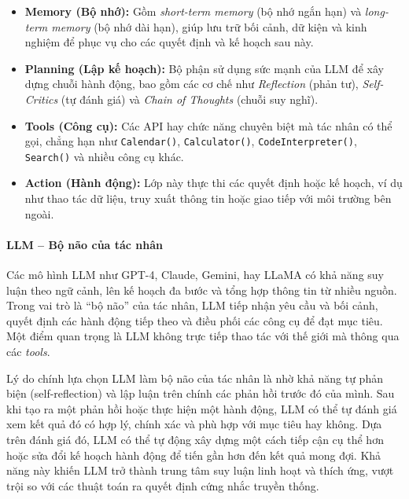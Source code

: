 \documentclass{article}
\begin{document}
\begin{itemize}[topsep=0pt, itemsep=0pt, leftmargin=40pt]
	\item \textbf{Memory (Bộ nhớ):} Gồm \textit{short-term memory} (bộ nhớ ngắn hạn) và \textit{long-term memory} (bộ nhớ dài hạn), giúp lưu trữ bối cảnh, dữ kiện và kinh nghiệm để phục vụ cho các quyết định và kế hoạch sau này.
	\item \textbf{Planning (Lập kế hoạch):} Bộ phận sử dụng sức mạnh của LLM để xây dựng chuỗi hành động, bao gồm các cơ chế như \textit{Reflection} (phản tư), \textit{Self-Critics} (tự đánh giá) và \textit{Chain of Thoughts} (chuỗi suy nghĩ).
	\item \textbf{Tools (Công cụ):} Các API hay chức năng chuyên biệt mà tác nhân có thể gọi, chẳng hạn như \texttt{Calendar()}, \texttt{Calculator()}, \texttt{CodeInterpreter()}, \texttt{Search()} và nhiều công cụ khác.
	\item \textbf{Action (Hành động):} Lớp này thực thi các quyết định hoặc kế hoạch, ví dụ như thao tác dữ liệu, truy xuất thông tin hoặc giao tiếp với môi trường bên ngoài.
\end{itemize}

\paragraph{LLM – Bộ não của tác nhân}
Các mô hình LLM như GPT-4, Claude, Gemini, hay LLaMA có khả năng suy luận theo ngữ cảnh, lên kế hoạch đa bước và tổng hợp thông tin từ nhiều nguồn. Trong vai trò là “bộ não” của tác nhân, LLM tiếp nhận yêu cầu và bối cảnh, quyết định các hành động tiếp theo và điều phối các công cụ để đạt mục tiêu. Một điểm quan trọng là LLM không trực tiếp thao tác với thế giới mà thông qua các \textit{tools}.

Lý do chính lựa chọn LLM làm bộ não của tác nhân là nhờ khả năng tự phản biện (self-reflection) và lập luận trên chính các phản hồi trước đó của mình. Sau khi tạo ra một phản hồi hoặc thực hiện một hành động, LLM có thể tự đánh giá xem kết quả đó có hợp lý, chính xác và phù hợp với mục tiêu hay không. Dựa trên đánh giá đó, LLM có thể tự động xây dựng một cách tiếp cận cụ thể hơn hoặc sửa đổi kế hoạch hành động để tiến gần hơn đến kết quả mong đợi. Khả năng này khiến LLM trở thành trung tâm suy luận linh hoạt và thích ứng, vượt trội so với các thuật toán ra quyết định cứng nhắc truyền thống.
\end{document}
